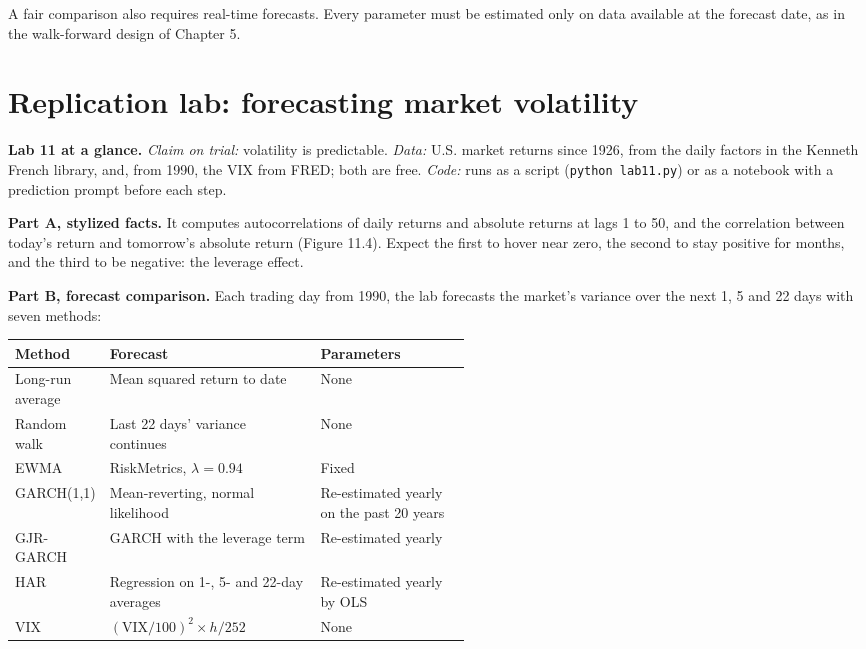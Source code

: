 A fair comparison also requires real-time forecasts. Every parameter must be estimated only on data available at the forecast date, as in the walk-forward design of Chapter 5.

\section{Replication lab: forecasting market volatility}
\label{sec:11-lab}

\begin{callout}
\textbf{Lab 11 at a glance.} \emph{Claim on trial:} volatility is predictable. \emph{Data:} U.S. market returns since 1926, from the daily factors in the Kenneth French library, and, from 1990, the VIX from FRED; both are free. \emph{Code:} runs as a script (\texttt{python lab11.py}) or as a notebook with a prediction prompt before each step.
\end{callout}

\textbf{Part A, stylized facts.} It computes autocorrelations of daily returns and absolute returns at lags 1 to 50, and the correlation between today's return and tomorrow's absolute return (Figure 11.4). Expect the first to hover near zero, the second to stay positive for months, and the third to be negative: the leverage effect.

\textbf{Part B, forecast comparison.} Each trading day from 1990, the lab forecasts the market's variance over the next 1, 5 and 22 days with seven methods:

\begin{center}
\small
\begin{tabularx}{0.9\linewidth}{@{}>{\raggedright\arraybackslash}p{0.20\linewidth}>{\raggedright\arraybackslash}X>{\raggedright\arraybackslash}p{0.33\linewidth}@{}}
\toprule
Method & Forecast & Parameters \\
\midrule
Long-run average & Mean squared return to date & None \\
Random walk & Last 22 days' variance continues & None \\
EWMA & RiskMetrics, $\lambda = 0.94$ & Fixed \\
GARCH(1,1) & Mean-reverting, normal likelihood & Re-estimated yearly on the past 20 years \\
GJR-GARCH & GARCH with the leverage term & Re-estimated yearly \\
HAR & Regression on 1-, 5- and 22-day averages & Re-estimated yearly by OLS \\
VIX & $(\mathrm{VIX}/100)^2 \times h/252$ & None \\
\bottomrule
\end{tabularx}
\end{center}

